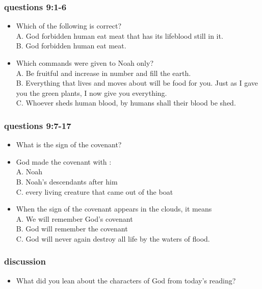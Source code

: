 \subsubsection{questions 9:1-6}
\begin{itemize}
\item Which of the following is correct?\\
A. God forbidden human eat meat that has its lifeblood still in it.\\
B. God forbidden human eat meat.
\item Which commands were given to Noah only? \\
A. Be fruitful and increase in number and fill the earth.\\
B. Everything that lives and moves about will be food for you. Just as I gave you the green plants, I now give you everything.\\
C. Whoever sheds human blood, by humans shall their blood be shed.
\end{itemize}

\subsubsection{questions 9:7-17}
\begin{itemize}
\item What is the sign of the covenant?
\item God made  the covenant with :\\
A. Noah\\
B. Noah's descendants after him\\
C. every living creature that came out of the boat\\
\item When the sign of the covenant appears in the clouds, it means\\
A. We will remember God's covenant\\
B. God will remember the covenant\\
C. God will never again destroy all life by the waters of flood.
\end{itemize}

\subsubsection{discussion}
\begin{itemize}
\item What did you lean about the characters of God from today's reading?
\end{itemize}
